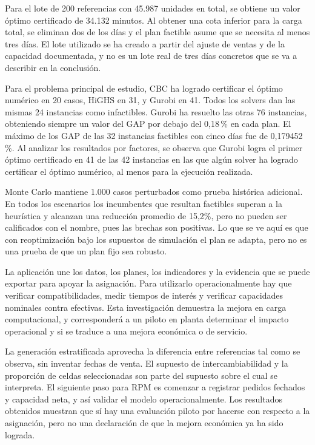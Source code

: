 \documentclass[12pt,a4paper,oneside]{article}
\begin{document}
Para el lote de 200 referencias con 45.987 unidades en total, se obtiene un valor óptimo certificado de 34.132 minutos. Al obtener una cota inferior para la carga total, se eliminan dos de los días y el plan factible asume que se necesita al menos tres días. El lote utilizado se ha creado a partir del ajuste de ventas y de la capacidad documentada, y no es un lote real de tres días concretos que se va a describir en la conclusión.

Para el problema principal de estudio, CBC ha logrado certificar el óptimo numérico en 20 casos, HiGHS en 31, y Gurobi en 41. Todos los solvers dan las mismas 24 instancias como infactibles. Gurobi ha resuelto las otras 76 instancias, obteniendo siempre un valor del GAP por debajo del 0,18\,\% en cada plan. El máximo de los GAP de las 32 instancias factibles con cinco días fue de 0,179452\,\%. Al analizar los resultados por factores, se observa que Gurobi logra el primer óptimo certificado en 41 de las 42 instancias en las que algún solver ha logrado certificar el óptimo numérico, al menos para la ejecución realizada.

Monte Carlo mantiene 1.000 casos perturbados como prueba histórica adicional. En todos los escenarios los incumbentes que resultan factibles superan a la heurística y alcanzan una reducción promedio de 15,2\%, pero no pueden ser calificados con el nombre, pues las brechas son positivas. Lo que se ve aquí es que con reoptimización bajo los supuestos de simulación el plan se adapta, pero no es una prueba de que un plan fijo sea robusto.

La aplicación une los datos, los planes, los indicadores y la evidencia que se puede exportar para apoyar la asignación. Para utilizarlo operacionalmente hay que verificar compatibilidades, medir tiempos de interés y verificar capacidades nominales contra efectivas. Esta investigación demuestra la mejora en carga computacional, y corresponderá a un piloto en planta determinar el impacto operacional y si se traduce a una mejora económica o de servicio.

La generación estratificada aprovecha la diferencia entre referencias tal como se observa, sin inventar fechas de venta. El supuesto de intercambiabilidad y la proporción de celdas seleccionadas son parte del supuesto sobre el cual se interpreta. El siguiente paso para RPM es comenzar a registrar pedidos fechados y capacidad neta, y así validar el modelo operacionalmente. Los resultados obtenidos muestran que sí hay una evaluación piloto por hacerse con respecto a la asignación, pero no una declaración de que la mejora económica ya ha sido lograda.
\end{document}
